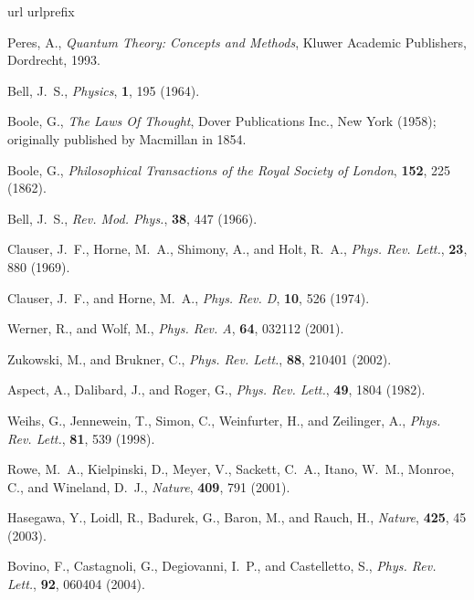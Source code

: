 \documentclass[pra,amsmath,amsfonts,showkeys,showpacs,preprint]{revtex4}
\begin{document}


\begin{thebibliography}{10}
\providecommand{\enquote}[1]{``#1''}
\expandafter\ifx\csname url\endcsname\relax
  \def\url#1{\texttt{#1}}\fi
\expandafter\ifx\csname urlprefix\endcsname\relax\def\urlprefix{URL }\fi

Peres, A., \emph{Quantum Theory: Concepts and Methods}, Kluwer Academic
  Publishers, Dordrecht, 1993.

Bell, J.~S., \emph{Physics}, \textbf{1}, 195 (1964).

Boole, G., \emph{The Laws Of Thought}, Dover Publications Inc., New
York (1958); originally published by Macmillan in 1854.

Boole, G., \emph{Philosophical Transactions of the Royal Society of London},
  \textbf{152}, 225 (1862).

Bell, J.~S., \emph{Rev. Mod. Phys.}, \textbf{38}, 447 (1966).

Clauser, J.~F., Horne, M.~A., Shimony, A., and Holt, R.~A., \emph{Phys. Rev.
  Lett.}, \textbf{23}, 880 (1969).

Clauser, J.~F., and Horne, M.~A., \emph{Phys. Rev. D}, \textbf{10}, 526 (1974).

Werner, R., and Wolf, M., \emph{Phys. Rev. A}, \textbf{64}, 032112 (2001).

Zukowski, M., and Brukner, C., \emph{Phys. Rev. Lett.}, \textbf{88}, 210401
  (2002).

Aspect, A., Dalibard, J., and Roger, G., \emph{Phys. Rev. Lett.}, \textbf{49},
  1804 (1982).

Weihs, G., Jennewein, T., Simon, C., Weinfurter, H., and Zeilinger, A.,
  \emph{Phys. Rev. Lett.}, \textbf{81}, 539 (1998).

Rowe, M.~A., Kielpinski, D., Meyer, V., Sackett, C.~A., Itano, W.~M., Monroe,
  C., and Wineland, D.~J., \emph{Nature}, \textbf{409}, 791 (2001).

Hasegawa, Y., Loidl, R., Badurek, G., Baron, M., and Rauch, H., \emph{Nature},
  \textbf{425}, 45 (2003).

Bovino, F., Castagnoli, G., Degiovanni, I.~P., and Castelletto, S., \emph{Phys.
  Rev. Lett.}, \textbf{92}, 060404 (2004).


\end{thebibliography}
\end{document}
